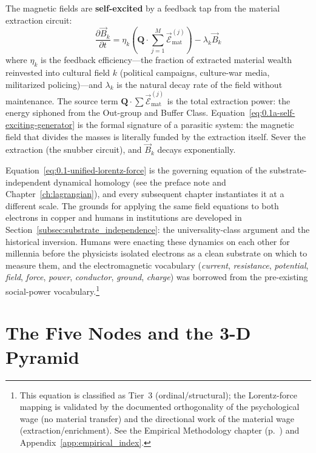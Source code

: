 The magnetic fields are \textbf{self-excited} by a feedback tap from the material extraction circuit:
\begin{equation}\label{eq:0.1a-self-exciting-generator}
\frac{\partial \vec{B}_k}{\partial t} = \eta_k \left( \mathbf{Q} \cdot \sum_{j=1}^{M}\vec{\mathcal{E}}_{\text{mat}}^{(j)} \right) - \lambda_k \vec{B}_k
\end{equation}
where $\eta_k$ is the feedback efficiency---the fraction of extracted material wealth reinvested into cultural field $k$ (political campaigns, culture-war media, militarized policing)---and $\lambda_k$ is the natural decay rate of the field without maintenance. The source term $\mathbf{Q} \cdot \sum \vec{\mathcal{E}}_{\text{mat}}^{(j)}$ is the total extraction power: the energy siphoned from the Out-group and Buffer Class. Equation~\eqref{eq:0.1a-self-exciting-generator} is the formal signature of a parasitic system: the magnetic field that divides the masses is literally funded by the extraction itself. Sever the extraction (the snubber circuit), and $\vec{B}_k$ decays exponentially.

Equation~\eqref{eq:0.1-unified-lorentz-force} is the governing equation of the substrate-independent dynamical homology (see the preface note and Chapter~\ref{ch:lagrangian}), and every subsequent chapter instantiates it at a different scale. The grounds for applying the same field equations to both electrons in copper and humans in institutions are developed in Section~\ref{subsec:substrate_independence}: the universality-class argument and the historical inversion. Humans were enacting these dynamics on each other for millennia before the physicists isolated electrons as a clean substrate on which to measure them, and the electromagnetic vocabulary (\textit{current}, \textit{resistance}, \textit{potential}, \textit{field}, \textit{force}, \textit{power}, \textit{conductor}, \textit{ground}, \textit{charge}) was borrowed from the pre-existing social-power vocabulary.\footnote{This equation is classified as
Tier~3 (ordinal/structural); the Lorentz-force mapping is validated by the
documented orthogonality of the psychological wage (no material transfer) and
the directional work of the material wage (extraction/enrichment). See the
Empirical Methodology chapter (p.~\pageref{ch:empirical_methodology}) and
Appendix~\ref{app:empirical_index}.}

\section{The Five Nodes and the 3-D Pyramid}
\label{sec:system_init_nodes}

